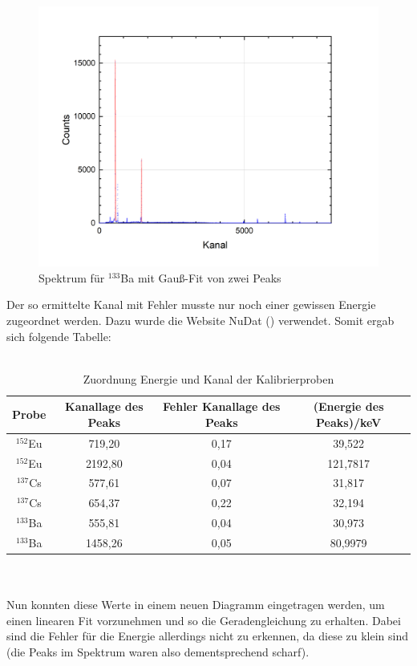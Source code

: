 \documentclass[german,  %
parskip=full,  %
]{scrartcl}
\begin{document}
\begin{figure}[h!]\centering
\includegraphics[scale=0.43]{Barium_Peaks}
\caption{Spektrum für $^{133}$Ba mit Gauß-Fit von zwei Peaks}
\end{figure}
\newpage
Der so ermittelte Kanal mit Fehler musste nur noch einer gewissen Energie zugeordnet werden. Dazu wurde die Website NuDat (\cite{nudat}) verwendet. Somit ergab sich folgende Tabelle:
\\\\
\begin{table}[h!]\centering
\begin{tabular}{|c|c|c|c|}\hline
Probe & Kanallage des Peaks & Fehler Kanallage des Peaks & (Energie des Peaks)/keV \\\hline
$^{152}$Eu & 719,20 & 0,17 & 39,522 \\\hline
$^{152}$Eu & 2192,80 & 0,04 & 121,7817 \\\hline
$^{137}$Cs & 577,61 & 0,07 & 31,817 \\\hline
$^{137}$Cs & 654,37 & 0,22 & 32,194 \\\hline
$^{133}$Ba & 555,81 & 0,04 & 30,973 \\\hline
$^{133}$Ba & 1458,26 & 0,05 & 80,9979 \\\hline
\end{tabular}
\caption{Zuordnung Energie und Kanal der Kalibrierproben}
\end{table}
\\\\
Nun konnten diese Werte in einem neuen Diagramm eingetragen werden, um einen linearen Fit vorzunehmen und so die Geradengleichung zu erhalten. Dabei sind die Fehler für die Energie allerdings nicht zu erkennen, da diese zu klein sind (die Peaks im Spektrum waren also dementsprechend scharf).
\end{document}
